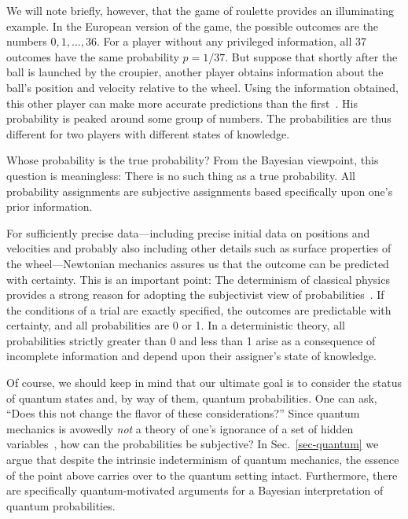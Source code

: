 We will note briefly, however, that the game of roulette provides
an illuminating example. In the European version of the game, the
possible outcomes are the numbers $0,1,\ldots,36$.  For a player
without any privileged information, all 37 outcomes have the same
probability $p=1/37$.  But suppose that shortly after the ball is
launched by the croupier, another player obtains information about
the ball's position and velocity relative to the wheel. Using the
information obtained, this other player can make more accurate
predictions than the first~\cite{NewtonianCasino}. His probability
is peaked around some group of numbers. The probabilities are
thus different for two players with different states of knowledge.

Whose probability is the true probability? From the Bayesian
viewpoint, this question is meaningless:  There is no such thing
as a true probability.  All probability assignments are subjective
assignments based specifically upon one's prior information.

For sufficiently precise data---including precise initial data on
positions and velocities and probably also including other details
such as surface properties of the wheel---Newtonian mechanics
assures us that the outcome can be predicted with certainty.  This
is an important point: The determinism of classical physics
provides a strong reason for adopting the subjectivist view of
probabilities~\cite{Giere1973}.  If the conditions of a trial are
exactly specified, the outcomes are predictable with certainty,
and all probabilities are 0 or 1. In a deterministic theory, all
probabilities strictly greater than 0 and less than 1 arise as a
consequence of incomplete information and depend upon their
assigner's state of knowledge.

Of course, we should keep in mind that our ultimate goal is to
consider the status of quantum states and, by way of them, quantum
probabilities. One can ask, ``Does this not change the flavor of
these considerations?'' Since quantum mechanics is avowedly {\it
not\/} a theory of one's ignorance of a set of hidden
variables~\cite{BellBook,GoldsteinBook}, how can the probabilities
be subjective?  In Sec.~\ref{sec-quantum} we argue that despite
the intrinsic indeterminism of quantum mechanics, the essence of
the point above carries over to the quantum setting intact.
Furthermore, there are specifically quantum-motivated arguments
for a Bayesian interpretation of quantum probabilities.

